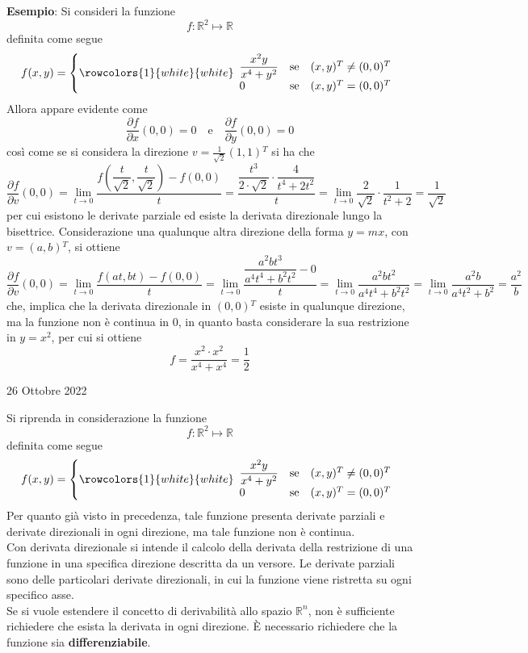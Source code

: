 \documentclass[a4paper]{extarticle}
\begin{document}
\vspace{1em}
\noindent
\textbf{Esempio}: Si consideri la funzione
\[f:\mathbb{R}^2 \longmapsto \mathbb{R}\]
definita come segue
\[f(x,y) = \left\{
    \rowcolors{1}{white}{white}
    \begin{array}{lll}
        \dfrac{x^2y}{x^4+y^2} & \text{se} & (x,y){^T}\neq(0,0){^T}\\
        0 & \text{se} & (x,y){^T}=(0,0){^T}\\
    \end{array}
    \right.    
\]
Allora appare evidente come
\[\frac{\partial f}{\partial x}(0,0) = 0 \hspace{1em} \text{e} \hspace{1em} \frac{\partial f}{\partial y}(0,0) = 0\]
così come se si considera la direzione $v=\frac{1}{\sqrt{2}}(1,1){^T}$ si ha che
\[\frac{\partial f}{\partial v}(0,0) = \lim_{t \to 0} \frac{f\left(\dfrac{t}{\sqrt{2}},\dfrac{t}{\sqrt{2}}\right) - f(0,0)}{t} = \dfrac{\dfrac{t^3}{2\cdot\sqrt{2}} \cdot \dfrac{4}{t^4+2t^2}}{t} = \lim_{t \to 0} \frac{2}{\sqrt{2}} \cdot \frac{1}{t^2 + 2} = \frac{1}{\sqrt{2}}\]
per cui esistono le derivate parziale ed esiste la derivata direzionale lungo la bisettrice. Considerazione una qualunque altra direzione della forma $y=mx$, con $v=(a,b){^T}$, si ottiene
\[\frac{\partial f}{\partial v}(0,0) = \lim_{t \to 0} \frac{f(at,bt)-f(0,0)}{t} = \lim_{t \to 0} \dfrac{\dfrac{a^2bt^3}{a^4t^4+b^2t^2}-0}{t}=\lim_{t \to 0} \frac{a^2bt^2}{a^4t^4+b^2t^2} = \lim_{t \to 0} \frac{a^2b}{a^4t^2+b^2} = \frac{a^2}{b}\]
che, implica che la derivata direzionale in $(0,0){^T}$ esiste in qualunque direzione, ma la funzione non è continua in $0$, in quanto basta considerare la sua restrizione in $y=x^2$, per cui si ottiene 
\[f=\frac{x^2 \cdot x^2}{x^4 + x^4} = \frac{1}{2}\]

\newpage
\noindent
\begin{center}
    26 Ottobre 2022
\end{center}
Si riprenda in considerazione la funzione
\[f:\mathbb{R}^2 \longmapsto \mathbb{R}\]
definita come segue
\[f(x,y) = \left\{
    \rowcolors{1}{white}{white}
    \begin{array}{lll}
        \dfrac{x^2y}{x^4+y^2} & \text{se} & (x,y){^T}\neq(0,0){^T}\\
        0 & \text{se} & (x,y){^T}=(0,0){^T}\\
    \end{array}
    \right.    
\]
Per quanto già visto in precedenza, tale funzione presenta derivate parziali e derivate direzionali in ogni direzione, ma tale funzione non è continua.\\
Con derivata direzionale si intende il calcolo della derivata della restrizione di una funzione in una specifica direzione descritta da un versore. Le derivate parziali sono delle particolari derivate direzionali, in cui la funzione viene ristretta su ogni specifico asse.\\
Se si vuole estendere il concetto di derivabilità allo spazio $\mathbb{R}^n$, non è sufficiente richiedere che esista la derivata in ogni direzione. È necessario richiedere che la funzione sia \textbf{differenziabile}.
\end{document}
